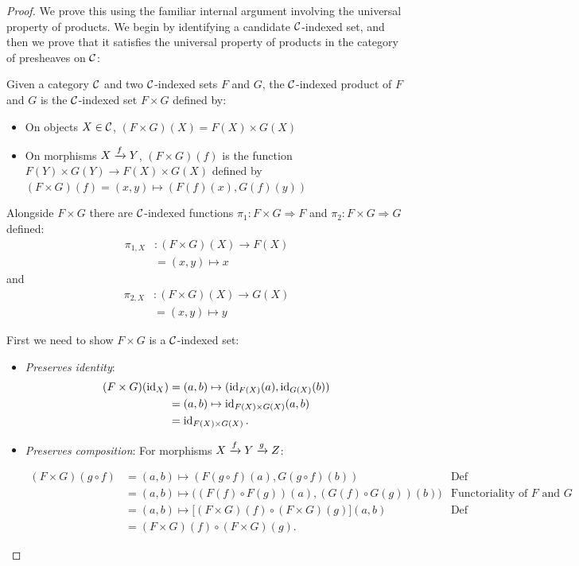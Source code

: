 \begin{proof}
We prove this using the familiar internal argument involving the 
universal property of products.  
We begin by identifying a candidate $\mathcal C$-indexed set, 
and then we prove that it satisfies the universal property of products
in the category of presheaves on $\mathcal C$:

\begin{definition}
  \sloppy
  Given a category $\mathcal C$ and two \(\mathcal C\)-indexed sets $F$ and $G$,
  the $\mathcal C$-indexed product of $F$ and $G$
  is the \(\mathcal C\)-indexed set
  $F \times G$
  defined by:
  \begin{itemize}
    \item On objects $X \in \mathcal C$, $(F \times G)(X) = F(X) \times G(X)$
    \item On morphisms $X \xrightarrow{f} Y$,
    $(F \times G)(f)$ is the function $F(Y) \times G(Y) \to F(X) \times G(X)$
      defined by $(F \times G)(f) = (x,y) \mapsto (F(f)(x), G(f)(y))$
  \end{itemize}

  Alongside $F \times G$ there are $\mathcal C$-indexed functions $\pi_1 : F \times G \Rightarrow F$ 
  and $\pi_2 : F \times G \Rightarrow G$ defined:
  \begin{align*}
    \pi_{1, X} &: (F \times G)(X) \to F(X) \\
    &=(x, y) \mapsto x
  \end{align*}
  and
  \begin{align*}
    \pi_{2, X} &: (F \times G)(X) \to G(X) \\
    &=(x, y) \mapsto y
  \end{align*}



\end{definition} 

First we need to show $F \times G$ is a $\mathcal C$-indexed set:
\begin{itemize}
  \item \emph{Preserves identity}: 
  \begin{align*}
  (F \times G)(\operatorname{id}_X) &= (a, b) \mapsto (\operatorname{id}_{F(X)}(a), \operatorname{id}_{G(X)}(b)) \\
  &=(a, b) \mapsto  \operatorname{id}_{F(X) \times G(X)} (a, b) \\
  &=\operatorname{id}_{F(X)\times G(X)}.
  \end{align*}
  \item \emph{Preserves composition}: For morphisms $X \xrightarrow{f} Y \xrightarrow{g} Z$:
  \begin{fullwidth}
   \begin{align*}
    (F \times G )(g \circ f) 
    &= (a,b) \mapsto (F(g \circ f)(a), G(g \circ f)(b)) & \text{Def} \\
    &= (a,b) \mapsto \big((F(f) \circ F(g))(a), (G(f) \circ G(g))(b)\big) & \text{Functoriality of $F$ and $G$} \\
    &= (a,b) \mapsto \big[ (F \times G)(f) \circ (F \times G) (g)\big](a,b) & \text{Def} \\
    &= (F \times G)(f) \circ (F \times G) (g).
  \end{align*}
   

\end{fullwidth}
\end{itemize}
\end{proof}
